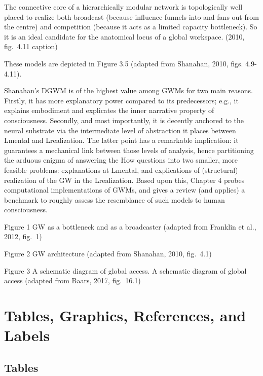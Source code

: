 \documentclass[12pt,twoside]{reedthesis}
\begin{document}
The connective core of a hierarchically modular network is topologically well placed to realize both broadcast (because influence funnels into and fans out from the centre) and competition (because it acts as a limited capacity bottleneck). So it is an ideal candidate for the anatomical locus of a global workspace. (2010, fig.~4.11 caption)

These models are depicted in Figure 3.5 (adapted from Shanahan, 2010, figs. 4.9-4.11).

Shanahan's DGWM is of the highest value among GWMs for two main reasons. Firstly, it has more explanatory power compared to its predecessors; e.g., it explains embodiment and explicates the inner narrative property of consciousness. Secondly, and most importantly, it is decently anchored to the neural substrate via the intermediate level of abstraction it places between Lmental and Lrealization. The latter point has a remarkable implication: it guarantees a mechanical link between those levels of analysis, hence partitioning the arduous enigma of answering the How questions into two smaller, more feasible problems: explanations at Lmental, and explications of (structural) realization of the GW in the Lrealization. Based upon this, Chapter 4 probes computational implementations of GWMs, and gives a review (and applies) a benchmark to roughly assess the resemblance of such models to human consciousness.

Figure 1 GW as a bottleneck and as a broadcaster (adapted from Franklin et al., 2012, fig.~1)

Figure 2 GW architecture (adapted from Shanahan, 2010, fig.~4.1)

Figure 3 A schematic diagram of global access. A schematic diagram of global access (adapted from Baars, 2017, fig.~16.1)

\hypertarget{ref-labels}{%
\chapter{Tables, Graphics, References, and Labels}\label{ref-labels}}

\hypertarget{tables}{%
\section{Tables}\label{tables}}
\end{document}
